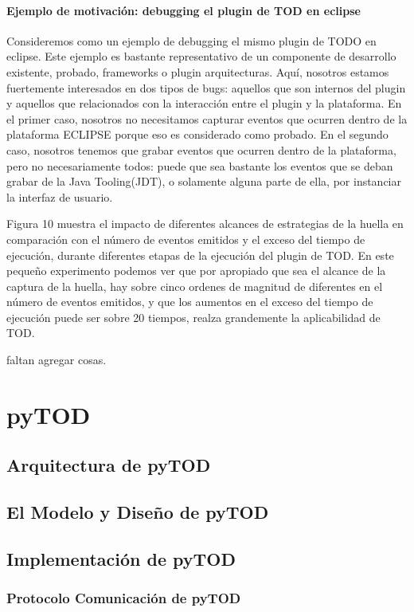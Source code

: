 \documentclass[12pt,a4paper]{report}
\begin{document}
			\subsubsection[Ejemplo de motivación]{Ejemplo de motivación: debugging el plugin de TOD en eclipse}

Consideremos como un ejemplo de debugging el mismo plugin de TODO en eclipse.  Este ejemplo es bastante representativo de un componente de desarrollo existente, probado, frameworks o plugin arquitecturas.  Aquí, nosotros estamos fuertemente interesados en dos tipos de bugs:  aquellos que son internos del plugin y aquellos que relacionados con la interacción entre el plugin y la plataforma.  En el primer caso, nosotros no necesitamos capturar eventos que ocurren dentro de la plataforma ECLIPSE porque eso es considerado como probado.  En el segundo caso, nosotros tenemos que grabar eventos que ocurren dentro de la plataforma, pero no necesariamente todos:  puede que sea bastante los eventos que se deban grabar de la Java Tooling(JDT), o solamente alguna parte de ella, por instanciar la interfaz de usuario.

Figura 10 muestra el impacto de diferentes alcances de estrategias de la huella en comparación con el número de eventos emitidos y el exceso del tiempo de ejecución, durante diferentes etapas de la ejecución del plugin de TOD.  En este pequeño experimento podemos ver que por apropiado que sea el alcance de la captura de la huella, hay sobre cinco ordenes de magnitud de diferentes en el número de eventos emitidos, y que los aumentos en el exceso del tiempo de ejecución puede ser sobre 20 tiempos, realza grandemente la aplicabilidad de TOD.

faltan agregar cosas.

\chapter{pyTOD}
	\section{Arquitectura de pyTOD}
	\section{El Modelo y Diseño de pyTOD}
	\section{Implementación de pyTOD}
		\subsection{Protocolo Comunicación de pyTOD}
\end{document}

